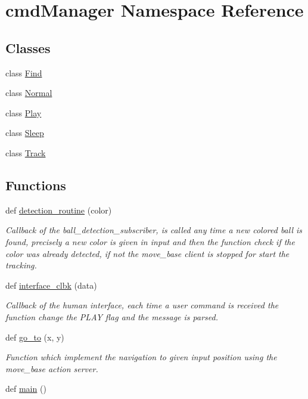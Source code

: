 \hypertarget{namespacecmdManager}{}\section{cmd\+Manager Namespace Reference}
\label{namespacecmdManager}
\subsection*{Classes}
\begin{DoxyCompactItemize}
\item 
class \hyperlink{classcmdManager_1_1Find}{Find}
\item 
class \hyperlink{classcmdManager_1_1Normal}{Normal}
\item 
class \hyperlink{classcmdManager_1_1Play}{Play}
\item 
class \hyperlink{classcmdManager_1_1Sleep}{Sleep}
\item 
class \hyperlink{classcmdManager_1_1Track}{Track}
\end{DoxyCompactItemize}
\subsection*{Functions}
\begin{DoxyCompactItemize}
\item 
def \hyperlink{namespacecmdManager_a62a68181d751176538db8063d7b11987}{detection\+\_\+routine} (color)
\begin{DoxyCompactList}\small\item\em Callback of the ball\+\_\+detection\+\_\+subscriber, is called any time a new colored ball is found, precisely a new color is given in input and then the function check if the color was already detected, if not the move\+\_\+base client is stopped for start the tracking. \end{DoxyCompactList}\item 
def \hyperlink{namespacecmdManager_ab7325e00047ae8c035e9d090f51b255e}{interface\+\_\+clbk} (data)
\begin{DoxyCompactList}\small\item\em Callback of the human interface, each time a user command is received the function change the P\+L\+AY flag and the message is parsed. \end{DoxyCompactList}\item 
def \hyperlink{namespacecmdManager_ac53d2d1248b660039d5a90768ff3bd5e}{go\+\_\+to} (x, y)
\begin{DoxyCompactList}\small\item\em Function which implement the navigation to given input position using the move\+\_\+base action server. \end{DoxyCompactList}\item 
def \hyperlink{namespacecmdManager_a3e64a5e295736776673178e6ff94d1e5}{main} ()
\end{DoxyCompactItemize}
